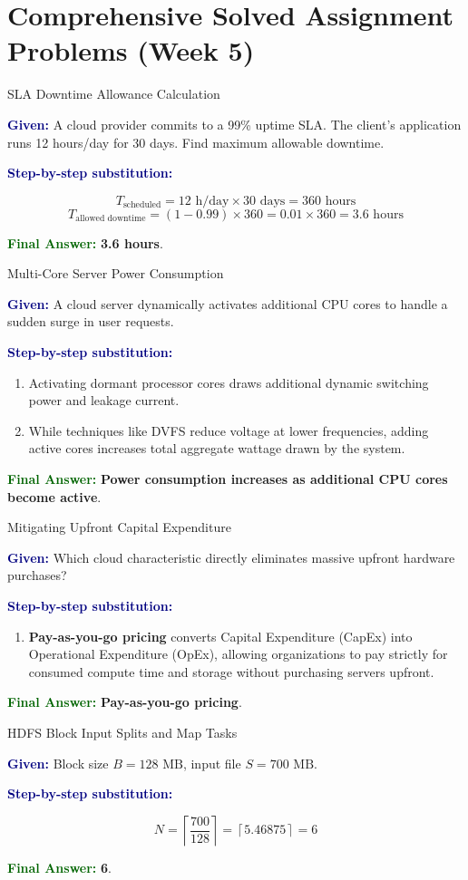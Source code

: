 \documentclass[11pt,a4paper,openany]{report}
\newcommand{\Given}{\par\textbf{\textcolor{navy}{Given:}} }
\newcommand{\Steps}{\par\textbf{\textcolor{navy}{Step-by-step substitution:}}\par}
\newcommand{\Answer}{\par\textbf{\textcolor{darkgreen}{Final Answer:}} }
\begin{document}
\section{Comprehensive Solved Assignment Problems (Week 5)}

\begin{solved}{SLA Downtime Allowance Calculation}
\Given A cloud provider commits to a 99\% uptime SLA. The client's application runs 12 hours/day for 30 days. Find maximum allowable downtime.
\Steps
\begin{equation}
T_{\text{scheduled}} = 12\text{ h/day} \times 30\text{ days} = 360\text{ hours}
\end{equation}
\begin{equation}
T_{\text{allowed downtime}} = (1 - 0.99) \times 360 = 0.01 \times 360 = 3.6\text{ hours}
\end{equation}
\Answer \textbf{3.6 hours}.
\end{solved}

\begin{solved}{Multi-Core Server Power Consumption}
\Given A cloud server dynamically activates additional CPU cores to handle a sudden surge in user requests.
\Steps
\begin{enumerate}[leftmargin=*]
  \item Activating dormant processor cores draws additional dynamic switching power and leakage current.
  \item While techniques like DVFS reduce voltage at lower frequencies, adding active cores increases total aggregate wattage drawn by the system.
\end{enumerate}
\Answer \textbf{Power consumption increases as additional CPU cores become active}.
\end{solved}

\begin{solved}{Mitigating Upfront Capital Expenditure}
\Given Which cloud characteristic directly eliminates massive upfront hardware purchases?
\Steps
\begin{enumerate}[leftmargin=*]
  \item \textbf{Pay-as-you-go pricing} converts Capital Expenditure (CapEx) into Operational Expenditure (OpEx), allowing organizations to pay strictly for consumed compute time and storage without purchasing servers upfront.
\end{enumerate}
\Answer \textbf{Pay-as-you-go pricing}.
\end{solved}

\begin{solved}{HDFS Block Input Splits and Map Tasks}
\Given Block size $B = 128\text{ MB}$, input file $S = 700\text{ MB}$.
\Steps
\begin{equation}
N = \left\lceil \frac{700}{128} \right\rceil = \left\lceil 5.46875 \right\rceil = 6
\end{equation}
\Answer \textbf{6}.
\end{solved}
\end{document}
